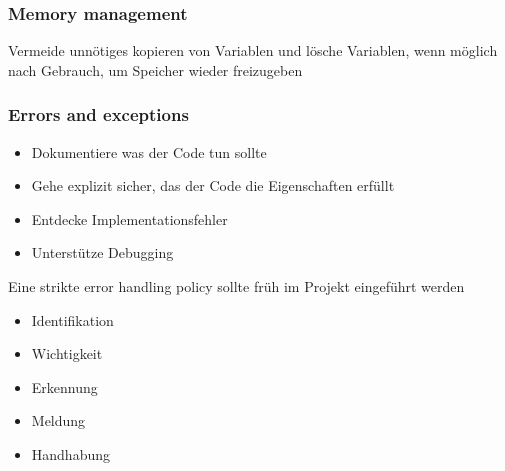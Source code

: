 \subsubsection{Memory management}
Vermeide unnötiges kopieren von Variablen und lösche Variablen, wenn möglich nach Gebrauch, um Speicher wieder freizugeben
\subsubsection{Errors and exceptions}
\begin{itemize}
	\item Dokumentiere was der Code tun sollte
	\item Gehe explizit sicher, das der Code die Eigenschaften erfüllt
	\item Entdecke Implementationsfehler
	\item Unterstütze Debugging
\end{itemize}
Eine strikte error handling policy sollte früh im Projekt eingeführt werden
\begin{itemize}
	\item Identifikation  
	\item Wichtigkeit
	\item Erkennung
	\item Meldung
	\item Handhabung
\end{itemize}




